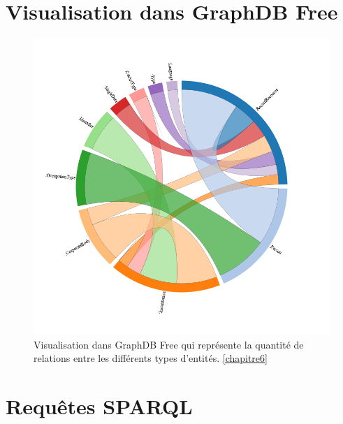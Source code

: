\documentclass[a4paper, 12pt, twoside]{book}
\begin{document}
\chapter{Visualisation dans GraphDB Free}
\begin{figure}[!h]
    \centering
    \includegraphics[width=0.8\linewidth]{annexes/dependencies-ORESM.png}
    \caption{Visualisation dans GraphDB Free qui représente la quantité de relations entre les différents types d'entités. \ref{chapitre6}}
    \label{fig:visualisation-classe-graphdb}
\end{figure}

\chapter{Requêtes SPARQL}


\backmatter

\listoffigures
\tableofcontents
\end{document}

